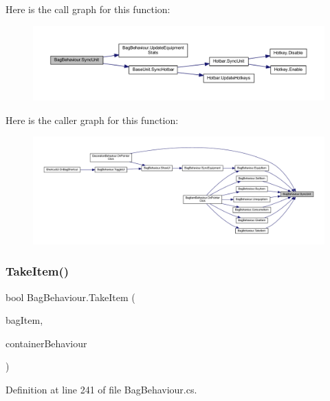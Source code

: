 Here is the call graph for this function\+:
\nopagebreak
\begin{figure}[H]
\begin{center}
\leavevmode
\includegraphics[width=350pt]{class_bag_behaviour_a1ab1c5f24022bf503ad3d3a18387515f_cgraph}
\end{center}
\end{figure}
Here is the caller graph for this function\+:
\nopagebreak
\begin{figure}[H]
\begin{center}
\leavevmode
\includegraphics[width=350pt]{class_bag_behaviour_a1ab1c5f24022bf503ad3d3a18387515f_icgraph}
\end{center}
\end{figure}
\mbox{\label{class_bag_behaviour_a0cde4989737c537ca94730cc690d6780}} 
\subsubsection{\texorpdfstring{TakeItem()}{TakeItem()}}
{\footnotesize\ttfamily bool Bag\+Behaviour.\+Take\+Item (\begin{DoxyParamCaption}\item[{\mbox{\hyperlink{class_bag_item_behaviour}{Bag\+Item\+Behaviour}}}]{bag\+Item,  }\item[{\mbox{\hyperlink{class_container_behaviour}{Container\+Behaviour}}}]{container\+Behaviour }\end{DoxyParamCaption})}



Definition at line 241 of file Bag\+Behaviour.\+cs.

